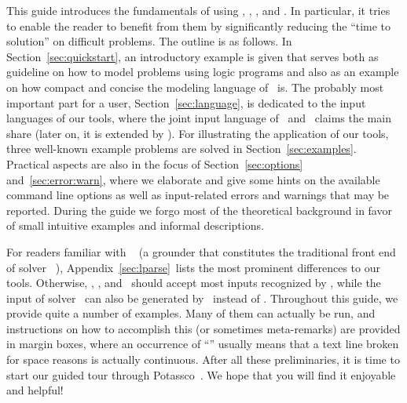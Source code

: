 This guide introduces the fundamentals of using
\gringo, \clasp, \clingo, and \iclingo.
In particular, it tries to enable the reader to benefit from them
by significantly reducing the ``time to solution'' on difficult problems.
The outline is as follows.
In Section~\ref{sec:quickstart},
an introductory example is given
that serves both as guideline on how to model problems using logic programs
and also as an example on how compact and concise the modeling language of \gringo\ is.
The probably most important part for a user, Section~\ref{sec:language},
is dedicated to the input languages of our tools,
where the joint input language of \gringo\ and \clingo\
claims the main share (later on, it is extended by \iclingo).
For illustrating the application of our tools,
three well-known example problems are solved in Section~\ref{sec:examples}.
Practical aspects are also in the focus of Section~\ref{sec:options} and~\ref{sec:error:warn},
where we elaborate and give some hints on the available command line options
as well as input-related errors and warnings that may be reported.
During the guide we forgo most of the theoretical background in favor
of small intuitive examples and informal descriptions.

For readers familiar with \lparse~\cite{lparseManual}
(a grounder that constitutes the traditional front end of solver \smodels~\cite{siniso02a}),
Appendix~\ref{sec:lparse}\comment{Appendix not updated yet}\ lists the most prominent differences to our tools.
Otherwise, \gringo, \clingo, and \iclingo\ should accept most inputs recognized by \lparse,
while the input of solver \clasp\ can also be generated by \lparse\ instead of \gringo.
Throughout this guide, we provide quite a number of examples.
Many of them can actually be run, and instructions on how to accomplish this
(or sometimes meta-remarks)
are provided in margin boxes, where an occurrence of ``''
usually means that a text line broken for space reasons is actually continuous.
After all these preliminaries, it is time to start our guided tour
through Potassco~\cite{potassco}.
We hope that you will find it enjoyable and helpful!

